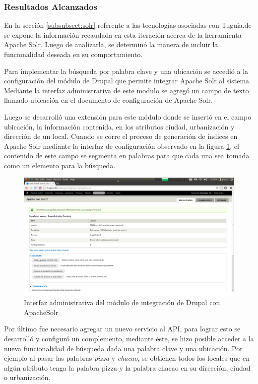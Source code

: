 \subsubsection{Resultados Alcanzados}

En la sección \ref{subsubsect:solr} referente a las tecnologías asociadas con Tuguia.de se expone la información recaudada en esta iteración acerca de la herramienta Apache Solr. Luego de analizarla, se determinó la manera de incluir la funcionalidad deseada en su comportamiento.

Para implementar la búsqueda por palabra clave y una ubicación se accedió a la configuración del módulo de Drupal que permite integrar Apache Solr al sistema. Mediante la interfaz administrativa de este modulo se agregó un campo de texto llamado ubicación en el documento de configuración de Apache Solr. 

Luego se desarrolló una extensión para este módulo donde se insertó en el campo ubicación, la información contenida, en los atributos ciudad, urbanización y dirección de un local. Cuando se corre el proceso de generación de indices en Apache Solr mediante la interfaz de configuración observado en la figura \ref{img:index_drupal}, el contenido de este campo se segmenta en palabras para que cada una sea tomada como un elemento para la búsqueda.

\begin{figure}[h]
	\begin{center}
		\includegraphics[scale=0.3]{imagenes/solr.png}
	\end{center}
	\caption{
		\label{img:index_drupal}
		Interfaz administrativa del módulo de integración de Drupal con ApacheSolr
	}
\end{figure}

Por último fue necesario agregar un nuevo servicio al API, para lograr esto se desarrolló y configuró un complemento, mediante éste, se hizo posible acceder a la nueva funcionalidad de  búsqueda dada una palabra clave y una ubicación. Por ejemplo al pasar las palabras \textit{pizza} y \textit{chacao}, se obtienen todos los locales que en algún atributo tenga la palabra pizza y la palabra chacao en su dirección, ciudad o urbanización.

